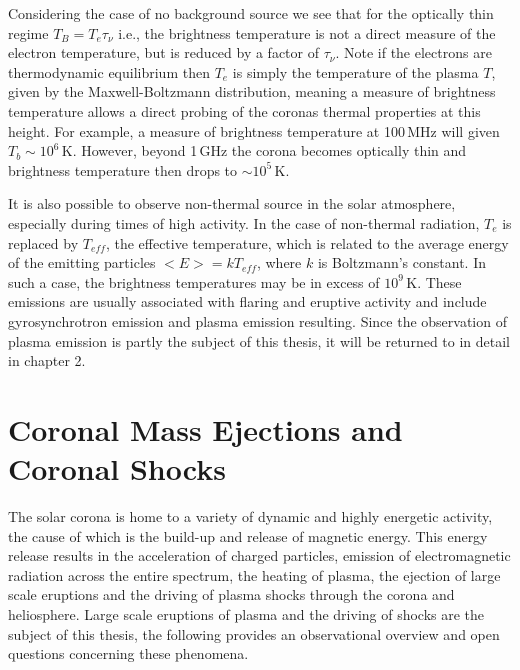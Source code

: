 Considering the case of no background source we see that for the optically thin regime $T_B = T_e\tau_{\nu}$ i.e., the brightness temperature is not a direct measure of the electron temperature, but is reduced by a factor of $\tau_{\nu}$. Note if the electrons are thermodynamic equilibrium then $T_e$ is simply the temperature of the plasma $T$, given by the Maxwell-Boltzmann distribution, meaning  a measure of brightness temperature allows a direct probing of the coronas thermal properties at this height. For example, a measure of brightness temperature at 100\,MHz will given $T_b\sim10^6$\,K. However, beyond 1\,GHz the corona becomes optically thin and brightness temperature then drops to $\sim10^{5}$\,K. 

It is also possible to observe non-thermal source in the solar atmosphere, especially during times of high activity. In the case of non-thermal radiation, $T_e$ is replaced by $T_{eff}$, the effective temperature, which is related to the average energy of the emitting particles $<E>=kT_{eff}$, where $k$ is Boltzmann's constant. In such a case, the brightness temperatures may be in excess of $10^{9}$\,K. These emissions are usually associated with flaring and eruptive activity and include gyrosynchrotron emission and plasma emission resulting. Since the observation of plasma emission is partly the subject of this thesis, it will be returned to in detail in chapter 2.




\section{Coronal Mass Ejections and Coronal Shocks}\label{sec:2}

The solar corona is home to a variety of dynamic and highly energetic activity, the cause of which is the build-up and release of magnetic energy. This energy release results in the acceleration of charged particles, emission of electromagnetic radiation across the entire spectrum, the heating of plasma, the ejection of large scale eruptions and the driving of plasma shocks through the corona and heliosphere. Large scale eruptions of plasma and the driving of shocks are the subject of this thesis, the following provides an observational overview and open questions concerning these phenomena.


